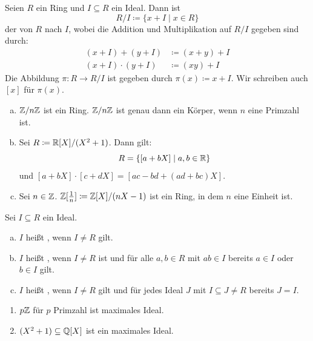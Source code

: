 \begin{definition}
  Seien \(R\) ein Ring und \(I\subseteq R\) ein Ideal.
  Dann ist
  \[
  R/I\coloneq \{x+I\mid x\in R\}
  \]
  der  von \(R\) nach \(I\),
  wobei die Addition und Multiplikation auf \(R/I\) gegeben sind durch:
  \begin{align*}
    (x+I) + (y+I) &\coloneq (x+y)+I \\
    (x+I) \cdot (y+I) &\coloneq (xy)+I
  \end{align*}
  Die Abbildung \(\pi:R\to R/I\) ist gegeben durch \(\pi(x)\coloneq x+I\).
  Wir schreiben auch \([x]\) für \(\pi(x)\)\index{\([x]\)}.
\end{definition}

\begin{beispiel}
  \begin{enumerate}[(a)]    
  \item \(\mathbb{Z}/n\mathbb{Z}\) ist ein Ring. \(\mathbb{Z}/n\mathbb{Z}\) ist genau dann ein Körper, wenn \(n\) eine Primzahl ist.
  \item Sei \(R\coloneq \mathbb{R}[X]/(X^2+1)\). Dann gilt:
    \[ R=\{[a+bX]\mid a,b\in \mathbb{R}\} \]
    und \([a+bX]\cdot [c+dX]=[ac-bd+(ad+bc)X]\).
  \item Sei \(n\in\mathbb{Z}\).
    \(\mathbb{Z}[\frac{1}{n}]\coloneq \mathbb{Z}[X]/(nX-1)\) ist ein Ring, in dem \(n\) eine Einheit ist.
  \end{enumerate}
\end{beispiel}

\begin{definition}
  Sei \(I\subseteq R\) ein Ideal.
  \begin{enumerate}[(a)]
  \item \(I\) heißt , wenn \(I\neq R\) gilt.
  \item \(I\) heißt , wenn \(I\neq R\) ist und für alle \(a,b\in R\) mit \(ab\in I\) bereits \(a\in I\) oder \(b\in I\) gilt.
  \item \(I\) heißt , wenn \(I\neq R\) gilt und für jedes Ideal \(J\) mit \(I\subseteq J\neq R\) bereits \(J=I\).
  \end{enumerate}
\end{definition}

\begin{beispiel}
  \begin{enumerate}
  \item \(p\mathbb{Z}\) für \(p\) Primzahl ist maximales Ideal.
  \item \((X^2+1)\subseteq \mathbb{Q}[X]\) ist ein maximales Ideal.
  \end{enumerate}
\end{beispiel}

